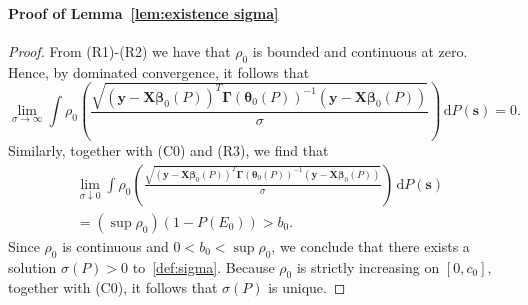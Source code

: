 \documentclass{article}
\numberwithin{equation}{section}
\theoremstyle{plain}
\newcommand{\bbeta}{\bm\beta}
\newcommand{\btheta}{\bm\theta}
\newcommand{\bGamma}{\bm\Gamma}
\newcommand{\by}{\mathbf{y}}
\newcommand{\bs}{\mathbf{s}}
\newcommand{\bX}{\mathbf{X}}
\begin{document}
\paragraph*{Proof of Lemma~\ref{lem:existence sigma}}
\begin{proof}
From (R1)-(R2) we have that $\rho_0$ is bounded and continuous at zero.
Hence, by dominated convergence, it follows that
\[
\lim_{\sigma\to\infty}
\int
\rho_0
\left(
\frac{\displaystyle\sqrt{(\by-\bX\bbeta_0(P))^T\bGamma(\btheta_0(P))^{-1}(\by-\bX\bbeta_0(P))}}{\sigma}
\right)
\,
\text{d}P(\bs)
=0.
\]
Similarly, together with (C0) and (R3), we find that
\[
\begin{split}
\lim_{\sigma\downarrow0}
\int
\rho_0
\left(
\frac{\displaystyle\sqrt{(\by-\bX\bbeta_0(P))^T\bGamma(\btheta_0(P))^{-1}(\by-\bX\bbeta_0(P))}}{\sigma}
\right)
\,
\text{d}P(\bs)\\
=
(\sup\rho_0)(1-P(E_0))
>
b_0.
\end{split}
\]
Since $\rho_0$ is continuous and $0<b_0<\sup\rho_0$, we conclude that there exists a solution $\sigma(P)>0$ to~\eqref{def:sigma}.
Because $\rho_0$ is strictly increasing on $[0,c_0]$, together with (C0), it follows that $\sigma(P)$ is unique.
\end{proof}
\end{document}
